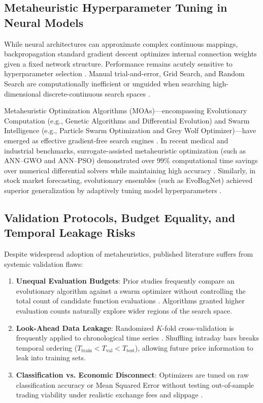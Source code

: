 \subsection{Metaheuristic Hyperparameter Tuning in Neural Models}\label{sec:rel_metaheuristics}

While neural architectures can approximate complex continuous mappings, backpropagation standard gradient descent optimizes internal connection weights given a fixed network structure. Performance remains acutely sensitive to hyperparameter selection \cite{dhingra2025solar, al_bannoud2026accelerating}. Manual trial-and-error, Grid Search, and Random Search are computationally inefficient or unguided when searching high-dimensional discrete-continuous search spaces \cite{bergstra2012random_search}.

Metaheuristic Optimization Algorithms (MOAs)—encompassing Evolutionary Computation (e.g., Genetic Algorithms and Differential Evolution) and Swarm Intelligence (e.g., Particle Swarm Optimization and Grey Wolf Optimizer)—have emerged as effective gradient-free search engines \cite{goldberg1989ga, kennedy1995pso, storn1997de, faris2018gwo_review}. In recent medical and industrial benchmarks, surrogate-assisted metaheuristic optimization (such as ANN–GWO and ANN–PSO) demonstrated over 99\% computational time savings over numerical differential solvers while maintaining high accuracy \cite{al_bannoud2026accelerating}. Similarly, in stock market forecasting, evolutionary ensembles (such as EvoBagNet) achieved superior generalization by adaptively tuning model hyperparameters \cite{bashir2026evobagnet}.

\subsection{Validation Protocols, Budget Equality, and Temporal Leakage Risks}\label{sec:rel_gaps}

Despite widespread adoption of metaheuristics, published literature suffers from systemic validation flaws:

\begin{enumerate}
    \item \textbf{Unequal Evaluation Budgets}: Prior studies frequently compare an evolutionary algorithm against a swarm optimizer without controlling the total count of candidate function evaluations \cite{dhingra2025solar, rajwar2023exhaustive_review}. Algorithms granted higher evaluation counts naturally explore wider regions of the search space.
    \item \textbf{Look-Ahead Data Leakage}: Randomized $K$-fold cross-validation is frequently applied to chronological time series \cite{souza2026ijcnn, simatupang2026stock}. Shuffling intraday bars breaks temporal ordering ($T_{\text{train}} < T_{\text{val}} < T_{\text{test}}$), allowing future price information to leak into training sets.
    \item \textbf{Classification vs. Economic Disconnect}: Optimizers are tuned on raw classification accuracy or Mean Squared Error without testing out-of-sample trading viability under realistic exchange fees and slippage \cite{chicco2020mcc, bareket2024adaptive}.
\end{enumerate}

